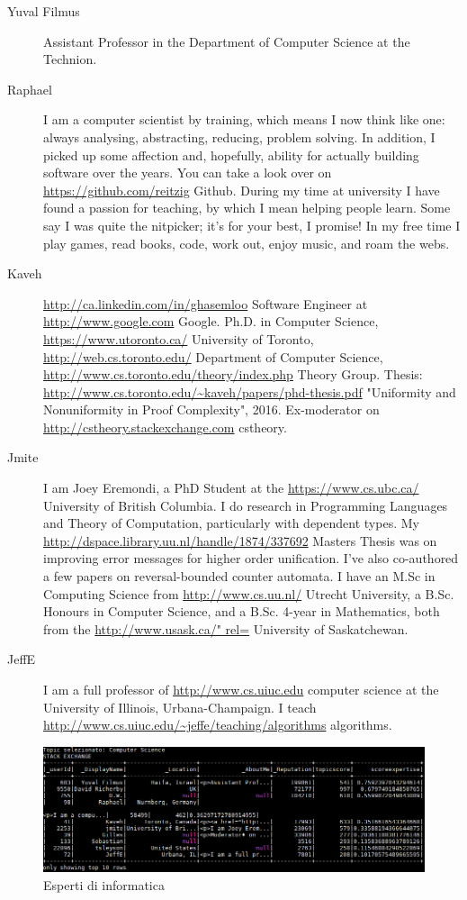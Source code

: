 \begin{description}
\item[Yuval Filmus]Assistant Professor in the Department of Computer Science at the Technion.
\item[Raphael]I am a computer scientist by training, which means I now think like one: always analysing,  abstracting, reducing, problem solving. In addition, I picked up some affection and, hopefully, ability for actually building software over the years. You can take a look over on \url{https://github.com/reitzig} Github. During my time at university I have found a passion for teaching, by which I mean helping people learn. Some say I was quite the nitpicker; it's for your best, I promise! In my free time I play games, read books, code, work out, enjoy music, and roam the webs.
\item[Kaveh]\url{http://ca.linkedin.com/in/ghasemloo} Software Engineer at \url{http://www.google.com} Google. Ph.D. in Computer Science, \url{https://www.utoronto.ca/} University of Toronto, \url{http://web.cs.toronto.edu/} Department of Computer Science, \url{http://www.cs.toronto.edu/theory/index.php} Theory Group. Thesis: \url{http://www.cs.toronto.edu/~kaveh/papers/phd-thesis.pdf} "Uniformity and Nonuniformity in Proof Complexity", 2016. Ex-moderator on \url{http://cstheory.stackexchange.com} cstheory.
\item[Jmite]I am Joey Eremondi, a PhD Student at the \url{https://www.cs.ubc.ca/} University of British Columbia. I do research in Programming Languages and Theory of Computation, particularly with dependent types. My \url{http://dspace.library.uu.nl/handle/1874/337692} Masters Thesis was on improving error messages for higher order unification. I've also co-authored a few papers on reversal-bounded counter automata. I have an M.Sc in Computing Science from \url{http://www.cs.uu.nl/} Utrecht University, a B.Sc. Honours in Computer Science, and a B.Sc. 4-year in Mathematics, both from the \url{http://www.usask.ca/" rel=} University of Saskatchewan.
\item[JeffE]I am a full professor of \url{http://www.cs.uiuc.edu} computer science at the University of Illinois, Urbana-Champaign.  I teach \url{http://www.cs.uiuc.edu/~jeffe/teaching/algorithms} algorithms.

\end{description}

\begin{figure}[H]
	\centering
	\includegraphics[scale=0.7]{image/cs.PNG}
	\caption{Esperti di informatica}
	\label{fig:cs}
\end{figure}

